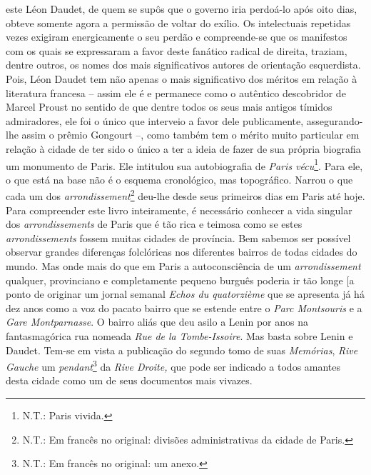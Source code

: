 este Léon Daudet, de quem se supôs que o governo iria perdoá-lo após
oito dias, obteve somente agora a permissão de voltar do exílio. Os
intelectuais repetidas vezes exigiram energicamente o seu perdão e
compreende-se que os manifestos com os quais se expressaram a favor
deste fanático radical de direita, traziam, dentre outros, os nomes dos
mais significativos autores de orientação esquerdista. Pois, Léon Daudet
tem não apenas o mais significativo dos méritos em relação à literatura
francesa -- assim ele é e permanece como o autêntico descobridor de
Marcel Proust no sentido de que dentre todos os seus mais antigos
tímidos admiradores, ele foi o único que interveio a favor dele
publicamente, assegurando-lhe assim o prêmio Gongourt --, como também
tem o mérito muito particular em relação à cidade de ter sido o único a
ter a ideia de fazer de sua própria biografia um monumento de Paris. Ele
intitulou sua autobiografia de \emph{Paris vécu}\footnote{N.T.: Paris
  vivida.}. Para ele, o que está na base não é o esquema cronológico,
mas topográfico. Narrou o que cada um dos
\emph{arrondissement}\footnote{N.T.: Em francês no original: divisões
  administrativas da cidade de Paris.} deu-lhe desde seus primeiros dias
em Paris até hoje. Para compreender este livro inteiramente, é
necessário conhecer a vida singular dos \emph{arrondissements} de Paris
que é tão rica e teimosa como se estes \emph{arrondissements} fossem
muitas cidades de província. Bem sabemos ser possível observar grandes
diferenças folclóricas nos diferentes bairros de todas cidades do mundo.
Mas onde mais do que em Paris a autoconsciência de um
\emph{arrondissement} qualquer, provinciano e completamente pequeno
burguês poderia ir tão longe {[}a ponto de originar um jornal semanal
\emph{Echos du quatorzième} que se apresenta já há dez anos como a voz
do pacato bairro que se estende entre o \emph{Parc Montsouris} e a
\emph{Gare Montparnasse}. O bairro aliás que deu asilo a Lenin por anos
na fantasmagórica rua nomeada \emph{Rue de la Tombe-Issoire}. Mas basta
sobre Lenin e Daudet. Tem-se em vista a publicação do segundo tomo de
suas \emph{Memórias}, \emph{Rive Gauche} um \emph{pendant}\footnote{N.T.:
  Em francês no original: um anexo.} da \emph{Rive Droite,} que pode ser
indicado a todos amantes desta cidade como um de seus documentos mais
vivazes.

